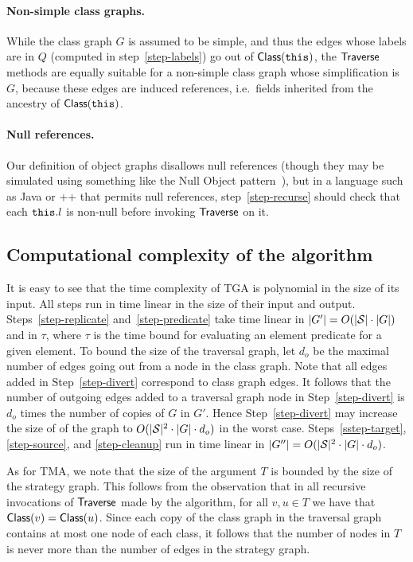 \paragraph{Non-simple class graphs.}  While the class graph $G$ is
assumed to be simple, and thus the edges whose labels are in $Q$
(computed in step~\ref{step-labels}) go out of $\mbox{\sf Class}({\tt this})$, the
$\mbox{\sf Traverse}$ methods are equally suitable for a non-simple class graph
whose simplification is $G$, because these edges are induced
references, i.e.~fields inherited from the ancestry of
$\mbox{\sf Class}({\tt this})$.

\paragraph{Null references.}  Our definition of object graphs
disallows null references (though they may be simulated using
something like the Null Object pattern~\cite{null-object}), but in a
language such as Java or \C++ that permits null references,
step~\ref{step-recurse} should check that each ${\tt this}.l$ is non-null
before invoking $\mbox{\sf Traverse}$ on it.


\subsection{Computational complexity of the algorithm}
\label{ssec-analysis}
It is easy to see that the time complexity of TGA is polynomial in the
size of its input.  All steps run in time linear in the size of their
input and output.  Steps~\ref{step-replicate} and~\ref{step-predicate}
take time linear in $|G'|=O(|{\cal S}|\cdot|G|)$ and in $\tau$, where
$\tau$ is the time bound for evaluating an element predicate for a
given element.  To bound the size of the traversal graph, let $d_o$ be
the maximal number of edges going out from a node in the class graph.
Note that all edges added in Step~\ref{step-divert} correspond to
class graph edges. It follows that the number of outgoing edges added
to a traversal graph node in Step~\ref{step-divert} is $d_o$ times the
number of copies of $G$ in $G'$.  Hence Step~\ref{step-divert} may
increase the size of of the graph to $O(|{\cal S}|^2\cdot|G|\cdot d_o)$ in
the worst case. Steps~\ref{sstep-target}, \ref{step-source}, and
\ref{step-cleanup} run in time linear in
$|G''|=O(|{\cal S}|^2\cdot|G|\cdot d_o)$.

As for TMA, we note that the size of the argument $T$ is bounded by
the size of the strategy graph. This follows from the observation that
in all recursive invocations of $\mbox{\sf Traverse}$ made by the algorithm, for
all $v,u\in T$ we have that $\mbox{\sf Class}(v)=\mbox{\sf Class}(u)$. Since each copy of
the class graph in the traversal graph contains at most one node of
each class, it follows that the number of nodes in $T$ is never more
than the number of edges in the strategy graph.%

